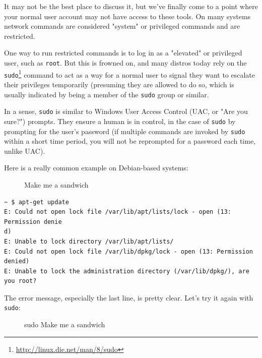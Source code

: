 \documentclass[10pt,]{book}
\renewcommand{\href}[2]{#2\footnote{\url{#1}}}
\numberwithin{figure}{chapter}
\DeclareRobustCommand{\drcap}[1]{\begin{figure}[H]\caption{#1}\end{figure}}
\DeclareRobustCommand{\drcmd}[1]{\index{Commands!#1}}
\begin{document}
It may not be the best place to discuss it, but we've finally come to a
point where your normal user account may not have access to these tools.
On many systems network commands are considered "system" or privileged
commands and are restricted.

One way to run restricted commands is to log in as a "elevated" or
privileged user, such as \texttt{root}. But this is frowned on, and many
distros today rely on the
\href{http://linux.die.net/man/8/sudo}{\texttt{sudo}}\drcmd{sudo}
command to act as a way for a normal user to signal they want to
escalate their privileges temporarily (presuming they are allowed to do
so, which is usually indicated by being a member of the \texttt{sudo}
group or similar.

In a sense, \texttt{sudo} is similar to Windows User Access Control
(UAC, or "Are you sure?") prompts. They ensure a human is in control, in
the case of \texttt{sudo} by prompting for the user's password (if
multiple commands are invoked by \texttt{sudo} within a short time
period, you will not be reprompted for a password each time, unlike
UAC).

Here is a really common example on Debian-based systems:

\drcap{Make me a sandwich}

\begin{verbatim}
~ $ apt-get update
E: Could not open lock file /var/lib/apt/lists/lock - open (13: Permission denie
d)
E: Unable to lock directory /var/lib/apt/lists/
E: Could not open lock file /var/lib/dpkg/lock - open (13: Permission denied)
E: Unable to lock the administration directory (/var/lib/dpkg/), are you root?
\end{verbatim}

The error message, especially the last line, is pretty clear. Let's try
it again with \texttt{sudo}:

\drcap{sudo Make me a sandwich}
\end{document}
